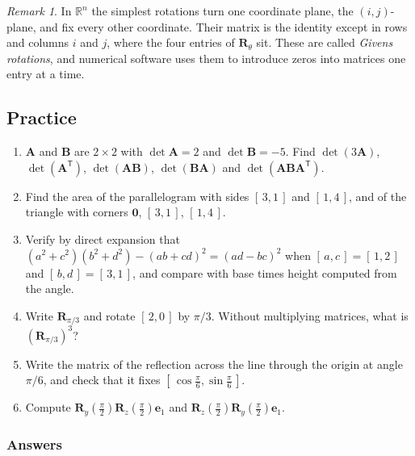 \documentclass[11pt]{article}
\theoremstyle{plain}
\theoremstyle{definition}
\theoremstyle{remark}
\newtheorem*{rmk}{Remark}
\newcommand{\R}{\mathbb{R}}
\newcommand{\vc}[1]{\mathbf{#1}}
\newcommand{\mt}[1]{\mathbf{#1}}
\newcommand{\T}{^{\mathsf{T}}}
\begin{document}
\begin{rmk}
In $\R^{n}$ the simplest rotations turn one coordinate plane, the $(i,j)$-plane,
and fix every other coordinate. Their matrix is the identity except in rows
and columns $i$ and $j$, where the four entries of $\mt{R}_\theta$ sit. These
are called \emph{Givens rotations}, and numerical software uses them to
introduce zeros into matrices one entry at a time.
\end{rmk}

\subsection{Practice}
\begin{enumerate}[label=\textbf{P\arabic*.},leftmargin=2.6em,itemsep=5pt]
  \item $\mt{A}$ and $\mt{B}$ are $2\times2$ with $\det\mt{A}=2$ and
        $\det\mt{B}=-5$. Find $\det(3\mt{A})$, $\det(\mt{A}\T)$,
        $\det(\mt{A}\mt{B})$, $\det(\mt{B}\mt{A})$ and
        $\det(\mt{A}\mt{B}\mt{A}\T)$.
  \item Find the area of the parallelogram with sides $[\,3,1\,]$ and
        $[\,1,4\,]$, and of the triangle with corners $\vc{0}$, $[\,3,1\,]$,
        $[\,1,4\,]$.
  \item Verify by direct expansion that
        $(a^{2}+c^{2})(b^{2}+d^{2})-(ab+cd)^{2}=(ad-bc)^{2}$ when
        $[\,a,c\,]=[\,1,2\,]$ and $[\,b,d\,]=[\,3,1\,]$, and compare with base
        times height computed from the angle.
  \item Write $\mt{R}_{\pi/3}$ and rotate $[\,2,0\,]$ by $\pi/3$. Without
        multiplying matrices, what is $(\mt{R}_{\pi/3})^{3}$?
  \item Write the matrix of the reflection across the line through the origin
        at angle $\pi/6$, and check that it fixes
        $[\,\cos\frac{\pi}{6},\sin\frac{\pi}{6}\,]$.
  \item Compute $\mt{R}_y(\frac{\pi}{2})\mt{R}_z(\frac{\pi}{2})\vc{e}_1$ and
        $\mt{R}_z(\frac{\pi}{2})\mt{R}_y(\frac{\pi}{2})\vc{e}_1$.
\end{enumerate}

\subsubsection*{Answers}
\end{document}
